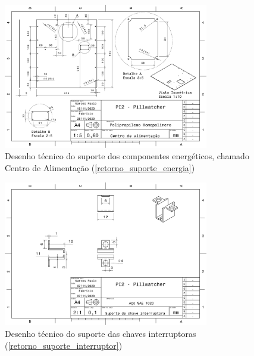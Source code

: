 \begin{apendicesenv}
\begin{figure}[H]
    \centering
    \includegraphics[width=0.8\textwidth]{figuras/estrutura/Desenhos/Centro_Alimentacao_V2.pdf}
    \caption{Desenho técnico do suporte dos componentes energéticos, chamado Centro de Alimentação (\ref{retorno_suporte_energia})}
    \label{fig:suporte_energia}
\end{figure}

\begin{figure}[H]
    \centering
    \includegraphics[width=0.8\textwidth]{figuras/estrutura/Desenhos/Suporte_interruptor.pdf}
    \caption{Desenho técnico do suporte das chaves interruptoras (\ref{retorno_suporte_interruptor})}
    \label{fig:suporte_interruptor}
\end{figure}


\end{apendicesenv}

